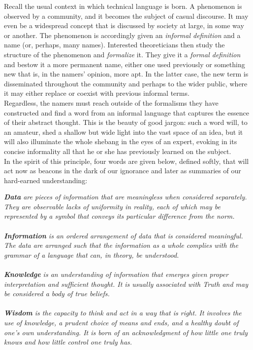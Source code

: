 Recall the usual context in which technical language is born. A phenomenon is observed by a community, and it becomes the subject of casual discourse. It may even be a widespread concept that is discussed by society at large, in some way or another. The phenomenon is accordingly given an \textit{informal definition} and a name (or, perhaps, many names). Interested theoreticians then study the structure of the phenomenon and \textit{formalize} it. They give it a \textit{formal definition} and bestow it a more permanent name, either one used previously or something new that is, in the namers' opinion, more apt. In the latter case, the new term is disseminated throughout the community and perhaps to the wider public, where it may either replace or coexist with previous informal terms. \\

Regardless, the namers must reach outside of the formalisms they have constructed and find a word from an informal language that captures the essence of their abstract thought. This is the beauty of good jargon: such a word will, to an amateur, shed a shallow but wide light into the vast space of an idea, but it will also illuminate the whole shebang in the eyes of an expert, evoking in its concise informality all that he or she has previously learned on the subject. \\

In the spirit of this principle, four words are given below, defined softly, that will act now as beacons in the dark of our ignorance and later as summaries of our hard-earned understanding: \\

\begin{displayquote}
	\textit{
		\textbf{Data} are pieces of information that are meaningless when considered separately. They are observable lacks of uniformity in reality, each of which may be represented by a symbol that conveys its particular difference from the norm. \\~\\
		\textbf{Information} is an ordered arrangement of data that is considered meaningful. The data are arranged such that the information as a whole complies with the grammar of a language that can, in theory, be understood. \\~\\
		\textbf{Knowledge} is an understanding of information that emerges given proper interpretation and sufficient thought. It is usually associated with Truth and may be considered a body of true beliefs. \\~\\
		\textbf{Wisdom} is the capacity to think and act in a way that is right. It involves the use of knowledge, a prudent choice of means and ends, and a healthy doubt of one's own understanding. It is born of an acknowledgment of how little one truly knows and how little control one truly has. \\
	}
\end{displayquote}

